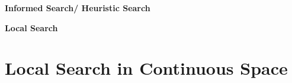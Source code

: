 \clearpage
{\centering\fontsize{22}{22}\selectfont\bfseries Informed Search/ Heuristic Search \par}
\vspace{0.5cm}










\clearpage
{\centering\fontsize{22}{22}\selectfont\bfseries Local Search \par}
\vspace{0.5cm}











\clearpage
\section{Local Search in Continuous Space}

